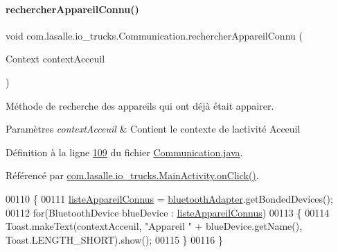 \mbox{\label{classcom_1_1lasalle_1_1io__trucks_1_1_communication_a5e754807ead5e695279657bea324b5d7}} 
\paragraph{\texorpdfstring{rechercher\+Appareil\+Connu()}{rechercherAppareilConnu()}}
{\footnotesize\ttfamily void com.\+lasalle.\+io\+\_\+trucks.\+Communication.\+rechercher\+Appareil\+Connu (\begin{DoxyParamCaption}\item[{Context}]{context\+Acceuil }\end{DoxyParamCaption})}



Méthode de recherche des appareils qui ont déjà était appairer. 


\begin{DoxyParams}{Paramètres}
{\em context\+Acceuil} & Contient le contexte de l\textquotesingle{}activité Acceuil \\
\hline
\end{DoxyParams}


Définition à la ligne \hyperlink{_communication_8java_source_l00109}{109} du fichier \hyperlink{_communication_8java_source}{Communication.\+java}.



Référencé par \hyperlink{_main_activity_8java_source_l00131}{com.\+lasalle.\+io\+\_\+trucks.\+Main\+Activity.\+on\+Click()}.


\begin{DoxyCode}
00110     \{
00111         \hyperlink{classcom_1_1lasalle_1_1io__trucks_1_1_communication_af0441da9cbe4ea858b82214ece930197}{listeAppareilConnus} = \hyperlink{classcom_1_1lasalle_1_1io__trucks_1_1_communication_aab37c21038f7b794ab77e6705b8b5938}{bluetoothAdapter}.getBondedDevices();
00112         \textcolor{keywordflow}{for}(BluetoothDevice blueDevice : \hyperlink{classcom_1_1lasalle_1_1io__trucks_1_1_communication_af0441da9cbe4ea858b82214ece930197}{listeAppareilConnus})
00113         \{
00114             Toast.makeText(contextAcceuil, \textcolor{stringliteral}{"Appareil "} + blueDevice.getName(), Toast.LENGTH\_SHORT).show();
00115         \}
00116     \}
\end{DoxyCode}
\mbox{\label{classcom_1_1lasalle_1_1io__trucks_1_1_communication_a84ae8043b94d6f156a30f6f90dbbba4e}} 
